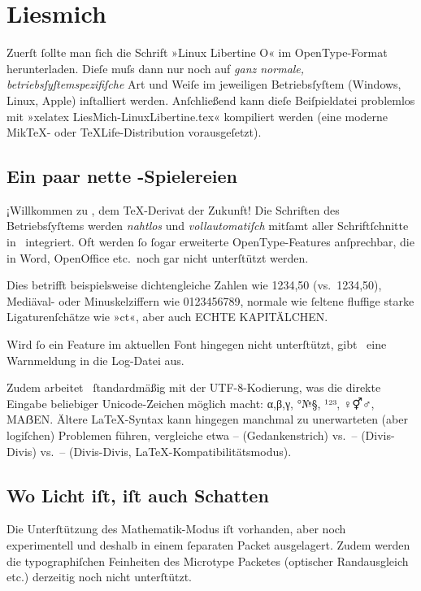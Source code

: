 ﻿\documentclass{scrartcl}
\begin{document}
\section*{Liesmich}
Zuerſt ſollte man ſich die Schrift »Linux Libertine O« im OpenType-Format herunterladen. Dieſe muſs dann nur noch auf \emph{ganz normale, betriebsſyſtemspezifiſche} Art und Weiſe im jeweiligen Betriebsſyſtem (Windows, Linux, Apple) inſtalliert werden. Anſchließend kann dieſe Beiſpieldatei problemlos mit »xelatex LiesMich-LinuxLibertine.tex« kompiliert werden (eine moderne Mik\TeX- oder \TeX Life-Distribution vorausgeſetzt).


\subsection*{Ein paar nette \XeLaTeX-Spielereien}
¡Willkommen zu \XeLaTeX, dem \TeX-Derivat der Zukunft! Die Schriften des Betriebsſyſtems werden \emph{nahtlos} und \emph{vollautomatiſch} mitſamt aller Schriftſchnitte in \XeTeX\ integriert. Oft werden ſo ſogar erweiterte OpenType-Features anſprechbar, die in Word, OpenOffice etc.\ noch gar nicht unterſtützt werden.

Dies betrifft beispielsweise dichtengleiche Zahlen wie {1234,50} (vs.\ 1234,50), Mediäval- oder Minuskelziffern wie {0123456789}, normale wie ſeltene {fluffige starke Ligaturenſchätze wie »ct«}, aber auch {ECHTE KAPITÄLCHEN}.

Wird ſo ein Feature im aktuellen Font hingegen nicht unterſtützt, gibt \XeTeX\ eine Warnmeldung in die Log-Datei aus.

Zudem arbeitet \XeLaTeX\ ſtandardmäßig mit der UTF-8-Kodierung, was die direkte Eingabe beliebiger Unicode-Zeichen möglich macht: α,β,γ, °№§, ¹²³, ♀⚥♂, MAẞEN. Ältere \LaTeX-Syntax kann hingegen manchmal zu unerwarteten (aber logiſchen) Problemen führen, vergleiche etwa – (Gedankenstrich) vs.\ -- (Divis-Divis) vs.\ {-- (Divis-Divis, \LaTeX-Kompatibilitätsmodus)}.


\subsection*{Wo Licht iſt, iſt auch Schatten}
Die Unterſtützung des Mathematik-Modus iſt vorhanden, aber noch experimentell und deshalb in einem ſeparaten Packet ausgelagert. Zudem werden die typographiſchen Feinheiten des Microtype Packetes (optischer Randausgleich etc.) derzeitig noch nicht unterſtützt.
\end{document}
